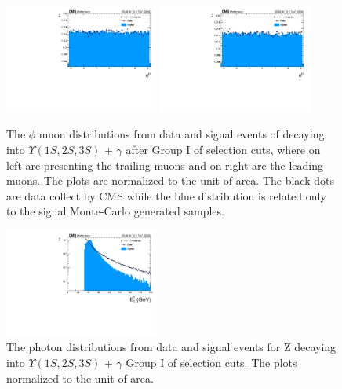 \begin{figure}[!htbp]
\begin{center}
\includegraphics[width=0.45\textwidth]{figures_and_tables/outputPlots/ZtoUpsilon_Cat0_ZZZZZ/au/data_x_mc/noKinCuts/h_noKin_TrailingMu_phi}\hspace*{1.cm}
\includegraphics[width=0.45\textwidth]{figures_and_tables/outputPlots/ZtoUpsilon_Cat0_ZZZZZ/au/data_x_mc/noKinCuts/h_noKin_LeadingMu_phi}
\end{center}\vspace*{-.5cm}
\caption{The $\phi$ muon distributions from data and signal events of \Z decaying into $\Upsilon(1S,2S,3S)$ + $\gamma$ after Group I of selection cuts, where on left are presenting the trailing muons and on right are the leading muons. The plots are normalized to the unit of area. The black dots are data collect by CMS while the blue distribution is related only to the signal Monte-Carlo generated samples.}
\label{fig:phiMuons_ZtoUpsilon_Cat0}
\end{figure}


\begin{figure}[!htbp]
\begin{center}
\includegraphics[width=0.45\textwidth]{figures_and_tables/outputPlots/ZtoUpsilon_Cat0_ZZZZZ/au/data_x_mc/noKinCuts/h_noKin_Photon_pt}\hspace*{1.cm}
\end{center}\vspace*{-.5cm}
\caption{The \PT photon distributions from data and signal events for Z decaying into $\Upsilon(1S,2S,3S)$ + $\gamma$ Group I of selection cuts. The plots normalized to the unit of area.}
\label{fig:pTPhoton_ZtoUpsilon_Cat0}
\end{figure}


